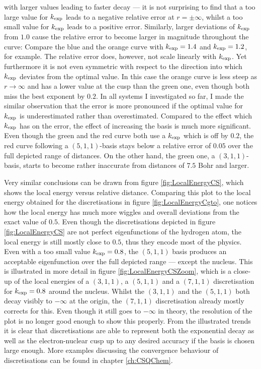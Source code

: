 with larger values leading to faster decay ---
it is not surprising to find that
a too large value for $k_\text{exp}$ leads to a negative relative error at $r = \pm \infty$,
whilst a too small value for $k_\text{exp}$ leads to a positive error.
Similarly, larger deviations of $k_\text{exp}$ from $1.0$
cause the relative error to become larger in magnitude throughout the curve:
Compare the blue and the orange curve with $k_\text{exp} = 1.4$ and $k_\text{exp} = 1.2$,
for example.
The relative error does, however, not scale linearly with $k_\text{exp}$.
Yet furthermore it is not even symmetric with respect to the direction
into which $k_\text{exp}$ deviates from the optimal value.
In this case the orange curve is less steep as $r\to\infty$ and has a lower value
at the cusp than the green one,
even though both miss the best exponent by $0.2$.
In all systems I investigated so far,
I made the similar observation that the error is more pronounced if the optimal
value for $k_\text{exp}$ is underestimated rather than overestimated.
Compared to the effect which $k_\text{exp}$ has on the error,
the effect of increasing the basis is much more significant.
Even though the green and the red curve both use a $k_\text{exp}$
which is off by $0.2$,
the red curve following a $(5,1,1)$-basis
stays below a relative error of $0.05$
over the full depicted range of distances.
On the other hand, the green one, a $(3,1,1)$-basis,
starts to become rather inaccurate from distances
of $7.5$ Bohr and larger.

Very similar conclusions can be drawn
from figure \vref{fig:LocalEnergyCS},
which shows the local energy versus relative distance.
Comparing this plot to the local energy obtained for the \cGTO
discretisations in figure \vref{fig:LocalEnergyCgto},
one notices how the \cGTO local energy has much more wiggles
and overall deviations from the exact value of $0.5$.
Even though the \CS discretisations depicted
in figure \ref{fig:LocalEnergyCS} are not perfect eigenfunctions
of the hydrogen atom,
the local energy is still mostly close to $0.5$,
thus they encode most of the physics.
Even with a too small value $k_\text{exp} = 0.8$,
the $(5,1,1)$ basis produces an acceptable eigenfunction over the full depicted
range --- except the nucleus.
This is illustrated in more detail in figure
\ref{fig:LocalEnergyCSZoom},
which is a close-up of the local energies of a $(3,1,1)$, a $(5,1,1)$
and a $(7,1,1)$ discretisation for $k_\text{exp} = 0.8$
around the nucleus.
Whilst the $(3,1,1)$ and the $(5,1,1)$ both decay visibly to $-\infty$ at the origin,
the $(7,1,1)$ discretisation already mostly corrects for this.
Even though it still goes to $-\infty$ in theory,
the resolution of the plot is no longer good enough to show this properly.
From the illustrated trends it is clear that
\CS discretisations are able to represent
both the exponential decay as well as the electron-nuclear cusp
up to any desired accuracy if the basis is chosen large enough.
More examples discussing the convergence behaviour of
\CS discretisations can be found in chapter \vref{ch:CSQChem}.

